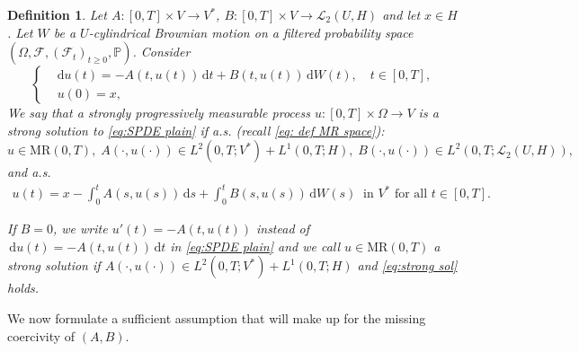 \documentclass{amsart}
\newcommand{\dd}{\,\mathrm{d}}
\newcommand{\ddd}{\mathrm{d}}
\renewcommand{\MR}{\mathrm{MR}}
\newcommand{\UH}{\mathscr{L}_2(U,H)}
\newcommand{\<}{\langle}
\newcommand{\?}{\rangle}
\theoremstyle{plain}
\theoremstyle{remark}
\theoremstyle{plain}
\newtheorem{definition}[theorem]{Definition}
\numberwithin{equation}{section}
\renewcommand{\P}{\mathbb{P}}
\newcommand{\Om}{\Omega}
\begin{document}
\begin{definition}\label{def:sol} 
Let $A\colon[0,T]\times V\to V^*$, $B\colon[0,T]\times V\to \UH$ and let $x\in H$. Let $W$ be a $U$-cylindrical Brownian motion on a filtered probability space $(\Om,\mathcal{F},(\mathcal{F}_t)_{t\geq 0},\P)$. Consider
\begin{equation}\label{eq:SPDE plain}
     \begin{cases}
   &\ddd u(t)=-A(t,u(t))\dd t+B(t,u(t))\dd W(t), \quad t\in[0,T], \\
   &u(0)=x,
\end{cases}
\end{equation}
We say that a strongly progressively measurable process $u\colon [0,T]\times \Om\to V$ is a \emph{strong solution} to \eqref{eq:SPDE plain} if a.s. (recall \eqref{eq: def MR space}): 
\[
u\in\MR(0,T),\; A(\cdot,u(\cdot))\in L^2(0,T;V^*)+L^1(0,T;H),\; B(\cdot,u(\cdot))\in L^2(0,T;\UH),
\]
and a.s.
\begin{align}\label{eq:strong sol}
  u(t)=x-\int_0^t A(s,u(s))\dd s+\int_0^t B(s,u(s))\dd W(s) \: \text{ in }V^* \text{ for all }t\in[0,T].
\end{align}

If $B=0$, we write $u'(t)=-A(t,u(t))$ instead of $\dd u(t)=-A(t,u(t))\dd t$ in \eqref{eq:SPDE plain} and we call $u\in \MR(0,T)$ a strong solution  if $A(\cdot,u(\cdot))\in L^2(0,T;V^*)+L^1(0,T;H)$ and \eqref{eq:strong sol} holds.
\end{definition}



 
We now formulate a sufficient assumption that will make up for the missing coercivity of $(A,B)$. 
\end{document}
